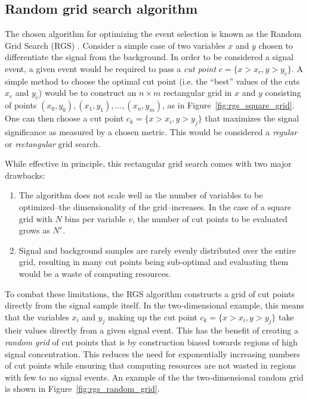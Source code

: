 
\subsection{Random grid search algorithm}\label{sswwupgrade:opt_rgs}
The chosen algorithm for optimizing the event selection is known as the Random Grid Search (RGS) \cite{2018.rgs-paper}.
Consider a simple case of two variables $x$ and $y$ chosen to differentiate the signal from the background.
In order to be considered a signal event, a given event would be required to pass a \emph{cut point} $c = \{x > x_c, y > y_c\}$.
A simple method to choose the optimal cut point (i.e. the ``best'' values of the cuts $x_c$ and $y_c$) would be to construct an $n\times m$ rectangular grid in $x$ and $y$ consisting of points $(x_0,y_0), (x_1,y_1), ..., (x_n,y_m)$, as in Figure~\ref{fig:rgs_square_grid}.
One can then choose a cut point $c_k = \{x > x_i, y > y_j\}$ that maximizes the signal significance as measured by a chosen metric.
This would be considered a \emph{regular} or \emph{rectangular} grid search.

While effective in principle, this rectangular grid search comes with two major drawbacks:
\begin{enumerate}
\item The algorithm does not scale well as the number of variables to be optimized--the dimensionality of the grid--increases.  In the case of a square grid with $N$ bins per variable $v$, the number of cut points to be evaluated grows as $N^v$.
\item Signal and background samples are rarely evenly distributed over the entire grid, resulting in many cut points being sub-optimal and evaluating them would be a waste of computing resources.
\end{enumerate}

To combat these limitations, the RGS algorithm constructs a grid of cut points directly from the signal sample itself.
In the two-dimensional example, this means that the variables $x_i$ and $y_j$ making up the cut point $c_k = \{x > x_i, y > y_j\}$ take their values directly from a given signal event.
This has the benefit of creating a \emph{random grid} of cut points that is by construction  biased towards regions of high signal concentration.
This reduces the need for exponentially increasing numbers of cut points while ensuring that computing resources are not wasted in regions with few to no signal events.
An example of the the two-dimensional random grid is shown in Figure~\ref{fig:rgs_random_grid}.

